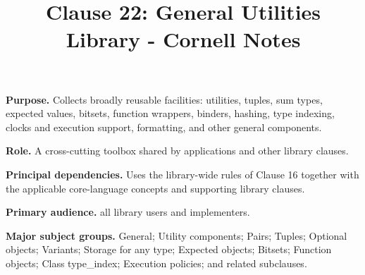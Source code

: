 \documentclass[11pt,letterpaper]{article}
\title{Clause 22: General Utilities Library - Cornell Notes}
\author{}
\date{}
\begin{document}
\maketitle
\begin{CornellReferenceOrientationBox}
\textbf{Purpose.} Collects broadly reusable facilities: utilities, tuples, sum types, expected values, bitsets, function wrappers, binders, hashing, type indexing, clocks and execution support, formatting, and other general components.
\par\textbf{Role.} A cross-cutting toolbox shared by applications and other library clauses.
\par\textbf{Principal dependencies.} Uses the library-wide rules of Clause 16 together with the applicable core-language concepts and supporting library clauses.
\par\textbf{Primary audience.} all library users and implementers.
\par\textbf{Major subject groups.} General; Utility components; Pairs; Tuples; Optional objects; Variants; Storage for any type; Expected objects; Bitsets; Function objects; Class type\_\allowbreak{}index; Execution policies; and related subclauses.
\end{CornellReferenceOrientationBox}
\end{document}
